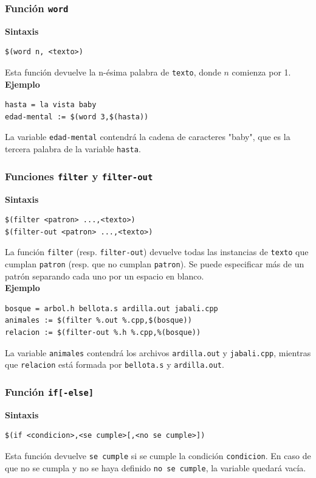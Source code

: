 \documentclass[11pt,twoside,titlepage,a4paper]{article}
\theoremstyle{definition}
\theoremstyle{plain_rojo}
\theoremstyle{remark}
\begin{document}
\subsubsection{Función \texttt{word}}

\textbf{\textcolor{burdeos}{Sintaxis}}
\begin{lstlisting}
$(word n, <texto>)
\end{lstlisting}
Esta función devuelve la n-ésima palabra de \texttt{texto}, donde $n$ 
comienza por 1.
\\

\textbf{\textcolor{burdeos}{Ejemplo}}
\begin{lstlisting}
hasta = la vista baby
edad-mental := $(word 3,$(hasta))
\end{lstlisting}
La variable \texttt{edad-mental} contendrá la cadena de caracteres "baby",
que es la tercera palabra de la variable \texttt{hasta}.

\subsubsection{Funciones \texttt{filter} y \texttt{filter-out}}

\textbf{\textcolor{burdeos}{Sintaxis}}
\begin{lstlisting}
$(filter <patron> ...,<texto>)
$(filter-out <patron> ...,<texto>)
\end{lstlisting}
La función \texttt{filter} (resp. \texttt{filter-out}) devuelve todas las 
instancias de \texttt{texto} que cumplan \texttt{patron} (resp. que no 
cumplan \texttt{patron}). Se puede especificar más de un patrón separando 
cada uno por un espacio en blanco. 
\\

\textbf{\textcolor{burdeos}{Ejemplo}}
\begin{lstlisting}
bosque = arbol.h bellota.s ardilla.out jabali.cpp
animales := $(filter %.out %.cpp,$(bosque))
relacion := $(filter-out %.h %.cpp,%(bosque))
\end{lstlisting}
La variable \texttt{animales} contendrá los archivos \texttt{ardilla.out} y
\texttt{jabali.cpp}, mientras que \texttt{relacion} está formada por 
\texttt{bellota.s} y \texttt{ardilla.out}.

\subsubsection{Función \texttt{if[-else]}}

\textbf{\textcolor{burdeos}{Sintaxis}}
\begin{lstlisting}
$(if <condicion>,<se cumple>[,<no se cumple>])
\end{lstlisting}
Esta función devuelve \texttt{se cumple} si se cumple la condición 
\texttt{condicion}. En caso de que no se cumpla y no se haya definido 
\texttt{no se cumple}, la variable quedará vacía.
\\
\end{document}
